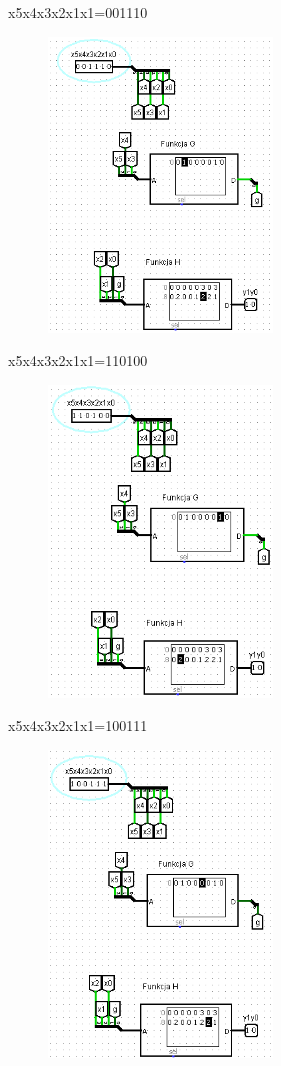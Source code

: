 \documentclass[]{article}
\begin{document}
\newpage
x5x4x3x2x1x1=001110
\begin{figure}[H]
	\centering
	\includegraphics[width=0.53\textwidth]{1.10.png}
\end{figure}
x5x4x3x2x1x1=110100
\begin{figure}[H]
	\centering
	\includegraphics[width=0.53\textwidth]{1.11.png}
\end{figure}
x5x4x3x2x1x1=100111
\begin{figure}[H]
	\centering
	\includegraphics[width=0.53\textwidth]{1.12.png}
\end{figure}
\end{document}
